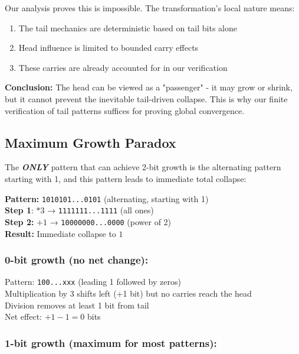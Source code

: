 \documentclass[10pt,letterpaper]{article}
\begin{document}
Our analysis proves this is impossible. The transformation's local nature means:
\begin{enumerate}
    \item The tail mechanics are deterministic based on tail bits alone
    \item Head influence is limited to bounded carry effects
    \item These carries are already accounted for in our verification
\end{enumerate}

\textbf{Conclusion:} The head can be viewed as a "passenger" - it may grow or shrink, but it cannot prevent the inevitable tail-driven collapse. This is why our finite verification of tail patterns suffices for proving global convergence.

\subsection{Maximum Growth Paradox}

The \textbf{\textit{ONLY}} pattern that can achieve 2-bit growth is the alternating pattern starting with 1, and this pattern leads to immediate total collapse:

\begin{tcolorbox}[colframe=black!50!black,colback=white!10!white] 
\textbf{Pattern:} \texttt{1010101...0101} (alternating, starting with 1) \\
\textbf{Step 1}:  $*3$ → \texttt{1111111...1111} (all ones) \\ 
\textbf{Step 2:}  $+1$ → \texttt{10000000...0000} (power of 2) \\
\textbf{Result: } Immediate collapse to $1$
\end{tcolorbox}


\subsubsection{0-bit growth (no net change):}

Pattern: \texttt{100...xxx}
 (leading 1 followed by zeros) \\
Multiplication by 3 shifts left (+1 bit) but no carries reach the head \\
Division removes at least 1 bit from tail \\
Net effect: $+1 - 1 = 0$ bits \\

\subsubsection{1-bit growth (maximum for most patterns):}
\end{document}
